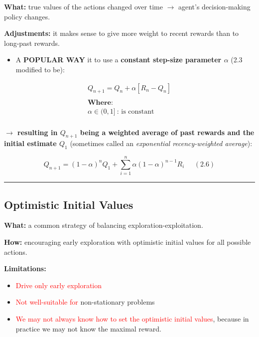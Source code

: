 \documentclass[12pt, a4paper]{article}
\begin{document}
\textbf{What:} true values of the actions changed over time
\(\rightarrow\) agent's decision-making policy changes.

\textbf{Adjustments:} it makes sense to give more weight to recent
rewards than to long-past rewards.

\begin{itemize}
\item
  A \textbf{POPULAR WAY} it to use a \textbf{constant step-size
  parameter \(\alpha\)} (2.3 modified to be):
\end{itemize}

\begin{gather*}
  Q_{n+1} = Q_n + \alpha [R_n - Q_n] \\ \\
  \textbf{Where:} \\
  \alpha \in (0,1]\ \text{: is constant} \\
\end{gather*}


\textbf{\(\rightarrow\) resulting in \(Q_{n+1}\) being a weighted
average of past rewards and the initial estimate \(Q_1\)} (sometimes
called an \emph{exponential recency-weighted average}):

\[Q_{n+1} = (1 - \alpha )^n Q_1 + \sum_{i=1}^n \alpha (1 - \alpha)^{n-1} R_i \;\;\;\;\;(2.6)\]

\begin{center}\rule{0.5\linewidth}{0.5pt}\end{center}











\subsection{Optimistic Initial Values}\label{optimistic-initial-values}


\textbf{What:} a common strategy of balancing exploration-exploitation.

\textbf{How:} encouraging early exploration with optimistic initial values for all possible actions.

\textbf{Limitations:}
\begin{itemize}
  \item \textcolor{red}{Drive only early exploration}
  \item \textcolor{red}{Not well-suitable for} non-stationary problems
  \item \textcolor{red}{We may not always know how to set the optimistic initial values}, because in practice we may not know the maximal reward.
\end{itemize}
\end{document}
